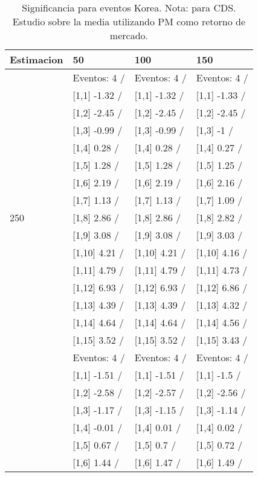 \begin{table}

\caption{Significancia para eventos Korea. Nota: para CDS. Estudio sobre la media utilizando PM como retorno de mercado.}
\centering
\begin{tabular}[t]{llll}
\toprule
Estimacion & 50 & 100 & 150\\
\midrule
 & Eventos:  4 / & Eventos:  4 / & Eventos:  4 /\\
 & {}[1,1] -1.32  / & {}[1,1] -1.32  / & {}[1,1] -1.33  /\\
 & {}[1,2] -2.45  / & {}[1,2] -2.45  / & {}[1,2] -2.45  /\\
 & {}[1,3] -0.99  / & {}[1,3] -0.99  / & {}[1,3] -1  /\\
 & {}[1,4] 0.28  / & {}[1,4] 0.28  / & {}[1,4] 0.27  /\\
\addlinespace
 & {}[1,5] 1.28  / & {}[1,5] 1.28  / & {}[1,5] 1.25  /\\
 & {}[1,6] 2.19  / & {}[1,6] 2.19  / & {}[1,6] 2.16  /\\
 & {}[1,7] 1.13  / & {}[1,7] 1.13  / & {}[1,7] 1.09  /\\
250 & {}[1,8] 2.86  / & {}[1,8] 2.86  / & {}[1,8] 2.82  /\\
 & {}[1,9] 3.08  / & {}[1,9] 3.08  / & {}[1,9] 3.03  /\\
\addlinespace
 & {}[1,10] 4.21  / & {}[1,10] 4.21  / & {}[1,10] 4.16  /\\
 & {}[1,11] 4.79  / & {}[1,11] 4.79  / & {}[1,11] 4.73  /\\
 & {}[1,12] 6.93  / & {}[1,12] 6.93  / & {}[1,12] 6.86  /\\
 & {}[1,13] 4.39  / & {}[1,13] 4.39  / & {}[1,13] 4.32  /\\
 & {}[1,14] 4.64  / & {}[1,14] 4.64  / & {}[1,14] 4.56  /\\
\addlinespace
 & {}[1,15] 3.52  / & {}[1,15] 3.52  / & {}[1,15] 3.43  /\\
 & Eventos:  4 / & Eventos:  4 / & Eventos:  4 /\\
 & {}[1,1] -1.51  / & {}[1,1] -1.51  / & {}[1,1] -1.5  /\\
 & {}[1,2] -2.58  / & {}[1,2] -2.57  / & {}[1,2] -2.56  /\\
 & {}[1,3] -1.17  / & {}[1,3] -1.15  / & {}[1,3] -1.14  /\\
\addlinespace
 & {}[1,4] -0.01  / & {}[1,4] 0.01  / & {}[1,4] 0.02  /\\
 & {}[1,5] 0.67  / & {}[1,5] 0.7  / & {}[1,5] 0.72  /\\
 & {}[1,6] 1.44  / & {}[1,6] 1.47  / & {}[1,6] 1.49  /\\

\end{tabular}
\end{table}
